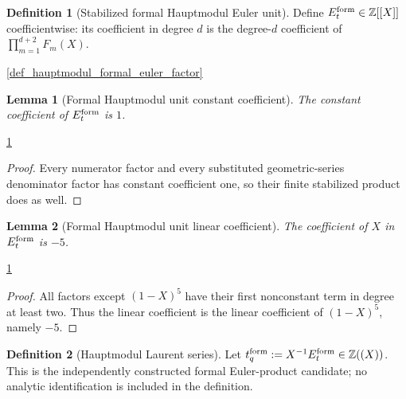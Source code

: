 \documentclass[11pt,a4paper]{article}
\numberwithin{equation}{section}
\theoremstyle{plain}\newtheorem{theorem}{Theorem}[section]\newaliascnt{proposition}{theorem}\newtheorem{proposition}[proposition]{Proposition}\aliascntresetthe{proposition}\newaliascnt{lemma}{theorem}\newtheorem{lemma}[lemma]{Lemma}\aliascntresetthe{lemma}
\theoremstyle{definition}\newaliascnt{definition}{theorem}\newtheorem{definition}[definition]{Definition}\aliascntresetthe{definition}\newaliascnt{notation}{theorem}\newtheorem{notation}[notation]{Notation}\aliascntresetthe{notation}
\providecommand{\lean}[1]{}\providecommand{\leanok}{}
\begin{document}
\begin{definition}[Stabilized formal Hauptmodul Euler unit]\label{def_hauptmodul_formal_euler_unit}\lean{SptCM.Repair.hauptmodulFormalEulerUnit}\leanok
Define $E_t^{\rm form}\in\mathbb Z[[X]]$ coefficientwise: its coefficient in
degree $d$ is the degree-$d$ coefficient of
$\prod_{m=1}^{d+2}F_m(X)$.
\end{definition}
\begin{uses-statement}\ref{def_hauptmodul_formal_euler_factor}\end{uses-statement}
\begin{lemma}[Formal Hauptmodul unit constant coefficient]\label{lem_i21_formal_euler_constant}\lean{SptCM.Repair.hauptmodulFormalEulerUnit_coeff_zero}\leanok
The constant coefficient of $E_t^{\rm form}$ is $1$.
\end{lemma}
\begin{uses-statement}\ref{def_hauptmodul_formal_euler_unit}\end{uses-statement}
\begin{proof}
Every numerator factor and every substituted geometric-series denominator
factor has constant coefficient one, so their finite stabilized product does
as well.
\end{proof}
\begin{lemma}[Formal Hauptmodul unit linear coefficient]\label{lem_i21_formal_euler_linear}\lean{SptCM.Repair.hauptmodulFormalEulerUnit_coeff_one}\leanok
The coefficient of $X$ in $E_t^{\rm form}$ is $-5$.
\end{lemma}
\begin{uses-statement}\ref{def_hauptmodul_formal_euler_unit}\end{uses-statement}
\begin{proof}
All factors except $(1-X)^5$ have their first nonconstant term in degree at
least two.  Thus the linear coefficient is the linear coefficient of
$(1-X)^5$, namely $-5$.
\end{proof}
\begin{definition}[Hauptmodul Laurent series]\label{def_hauptmodul_laurent}\lean{SptCM.Repair.hauptmodulFormalLaurent}\leanok
Let $t_q^{\rm form}:=X^{-1}E_t^{\rm form}\in\mathbb Z((X))$.  This is the
independently constructed formal Euler-product candidate; no analytic
identification is included in the definition.
\end{definition}
\end{document}
